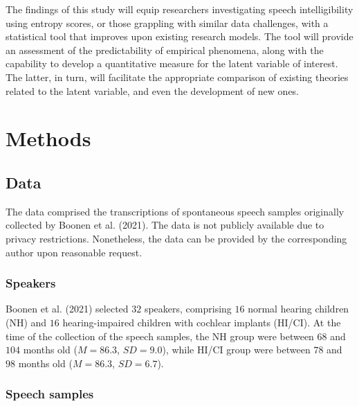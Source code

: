 \documentclass[
]{agujournal2019}
\begin{document}
The findings of this study will equip researchers investigating speech
intelligibility using entropy scores, or those grappling with similar
data challenges, with a statistical tool that improves upon existing
research models. The tool will provide an assessment of the
predictability of empirical phenomena, along with the capability to
develop a quantitative measure for the latent variable of interest. The
latter, in turn, will facilitate the appropriate comparison of existing
theories related to the latent variable, and even the development of new
ones.

\section{Methods}\label{sec-methods}

\subsection{Data}\label{sec-M-D}

The data comprised the transcriptions of spontaneous speech samples
originally collected by Boonen et al. (2021). The data is not publicly
available due to privacy restrictions. Nonetheless, the data can be
provided by the corresponding author upon reasonable request.

\subsubsection{Speakers}\label{sec-M-S}

Boonen et al. (2021) selected \(32\) speakers, comprising \(16\) normal
hearing children (NH) and \(16\) hearing-impaired children with cochlear
implants (HI/CI). At the time of the collection of the speech samples,
the NH group were between \(68\) and \(104\) months old (\(M=86.3\),
\(SD=9.0\)), while HI/CI group were between \(78\) and \(98\) months old
(\(M=86.3\), \(SD=6.7\)).

\subsubsection{Speech samples}\label{sec-M-SS}
\end{document}
